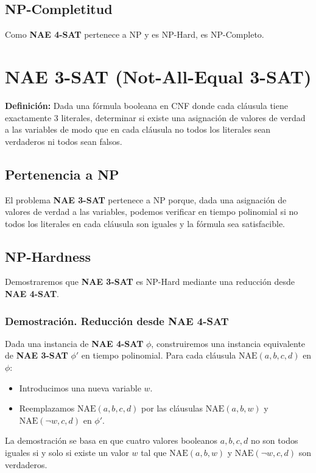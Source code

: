 \documentclass[a4paper,12pt]{article}
\begin{document}
\subsection{NP-Completitud}

Como \textbf{NAE 4-SAT} pertenece a NP y es NP-Hard, es NP-Completo.

\section{NAE 3-SAT (Not-All-Equal 3-SAT)}

\textbf{Definici\'on:} Dada una f\'ormula booleana en CNF donde cada cl\'ausula tiene exactamente 3 literales, determinar si existe una asignaci\'on de valores de verdad a las variables de modo que en cada cl\'ausula no todos los literales sean verdaderos ni todos sean falsos.

\subsection{Pertenencia a NP}
El problema \textbf{NAE 3-SAT} pertenece a NP porque, dada una asignaci\'on de valores de verdad a las variables, podemos verificar en tiempo polinomial si no todos los literales en cada cl\'ausula son iguales y la fórmula sea satisfacible.

\subsection{NP-Hardness}

Demostraremos que \textbf{NAE 3-SAT} es NP-Hard mediante una reducci\'on desde \textbf{NAE 4-SAT}.

\subsubsection{Demostraci\'on. Reducción desde NAE 4-SAT}
Dada una instancia de \textbf{NAE 4-SAT} $\phi$, construiremos una instancia equivalente de \textbf{NAE 3-SAT} $\phi'$ en tiempo polinomial. Para cada cl\'ausula $\text{NAE}(a, b, c, d)$ en $\phi$:
\begin{itemize}
    \item Introducimos una nueva variable $w$.
    \item Reemplazamos $\text{NAE}(a, b, c, d)$ por las cl\'ausulas $\text{NAE}(a, b, w)$ y $\text{NAE}(\neg w, c, d)$ en $\phi'$.
\end{itemize}

La demostración se basa en que cuatro valores booleanos $a, b, c, d$ no son todos iguales si y solo si existe un valor $w$ tal que $\text{NAE}(a, b, w)$ y $\text{NAE}(\neg w, c, d)$ son verdaderos.
\end{document}
